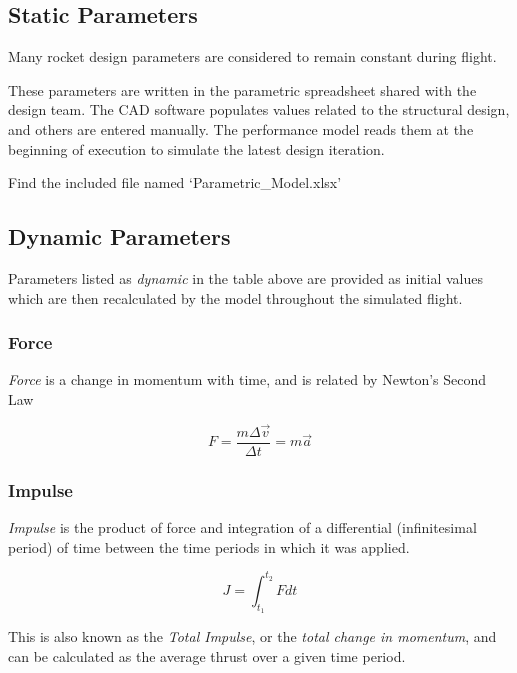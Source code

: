 \documentclass[]{article}
\begin{document}
\subsection{Static Parameters}\label{static-parameters}

Many rocket design parameters are considered to remain constant during
flight.

These parameters are written in the parametric spreadsheet shared with
the design team. The CAD software populates values related to the
structural design, and others are entered manually. The performance
model reads them at the beginning of execution to simulate the latest
design iteration.

Find the included file named `Parametric\_Model.xlsx'

\subsection{Dynamic Parameters}\label{dynamic-parameters}

Parameters listed as \emph{dynamic} in the table above are provided as
initial values which are then recalculated by the model throughout the
simulated flight.

\subsubsection{Force}\label{force}

\emph{Force} is a change in momentum with time, and is related by
Newton's Second Law

\begin{equation}
F = \dfrac{m \Delta \vec{v}}{\Delta t} = m\vec{a}
\end{equation}

\subsubsection{Impulse}\label{impulse}

\emph{Impulse} is the product of force and integration of a differential
(infinitesimal period) of time between the time periods in which it was
applied.

\begin{equation}
\label{impulse}
J = \int^{t_2}_{t_1} F dt
\end{equation}

This is also known as the \emph{Total Impulse}, or the \emph{total
change in momentum}, and can be calculated as the average thrust over a
given time period.
\end{document}
